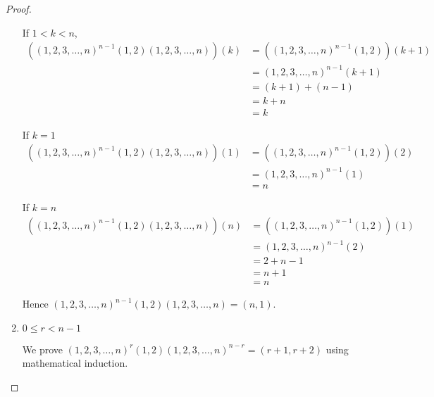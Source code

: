 \begin{proof}
\begin{enumerate}[label={\textbf{Case \arabic*.}},itemindent=1cm]
              If $1 < k < n$,
              \begin{align*}
                  ({(1,2,3,\ldots,n)}^{n-1}(1,2)(1,2,3,\ldots, n))(k) & = ({(1,2,3,\ldots,n)}^{n-1}(1,2))(k+1) \\
                                                                      & = {(1,2,3,\ldots,n)}^{n-1}(k+1)        \\
                                                                      & = (k + 1) + (n - 1)                    \\
                                                                      & = k + n                                \\
                                                                      & = k
              \end{align*}

              If $k = 1$
              \begin{align*}
                  ({(1,2,3,\ldots,n)}^{n-1}(1,2)(1,2,3,\ldots,n))(1) & = ({(1,2,3,\ldots,n)}^{n-1}(1,2))(2) \\
                                                                     & = {(1,2,3,\ldots,n)}^{n-1}(1)        \\
                                                                     & = n
              \end{align*}

              If $k = n$
              \begin{align*}
                  ({(1,2,3,\ldots,n)}^{n-1}(1,2)(1,2,3,\ldots,n))(n) & = ({(1,2,3,\ldots,n)}^{n-1}(1,2))(1) \\
                                                                     & = {(1,2,3,\ldots,n)}^{n-1}(2)        \\
                                                                     & = 2 + n - 1                          \\
                                                                     & = n + 1                              \\
                                                                     & = n
              \end{align*}

              Hence ${(1,2,3,\ldots,n)}^{n-1}(1,2)(1,2,3,\ldots,n) = (n,1)$.
        \item $0\leq r < n - 1$

              We prove ${(1,2,3,\ldots,n)}^{r}(1,2){(1,2,3,\ldots,n)}^{n-r} = (r+1,r+2)$ using mathematical induction.


\end{enumerate}
\end{proof}
